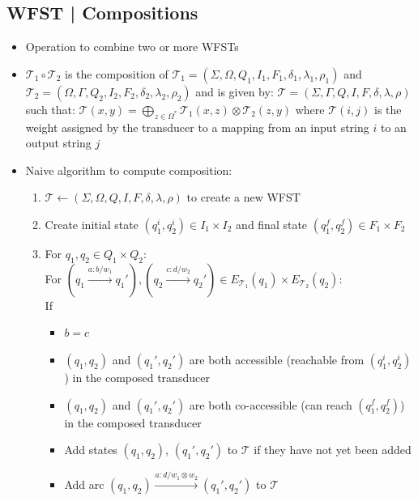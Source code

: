 \subsection*{WFST | Compositions}
\begin{itemize}
    \item Operation to combine two or more WFSTs
    \item $\mathcal{T}_1 \circ \mathcal{T}_2$ is the composition of $\mathcal{T}_1 = (\Sigma, \Omega, Q_1, I_1, F_1, \delta_1, \lambda_1, \rho_1)$ and $\mathcal{T}_2 = (\Omega, \Gamma, Q_2, I_2, F_2, \delta_2, \lambda_2, \rho_2)$ and is given by:
    $
    \mathcal{T} = (\Sigma, \Gamma, Q, I, F, \delta, \lambda, \rho)
    $
    such that:
    $
    \mathcal{T}(x, y) = \bigoplus_{z \in \Omega^*} \mathcal{T}_1(x, z) \otimes \mathcal{T}_2(z, y)
    $ where $\mathcal{T}(i,j)$ is the weight assigned by the transducer to a mapping from an input string $i$ to an output string $j$
    \item Naive algorithm to compute composition:
    \begin{enumerate}
        \item $\mathcal{T} \gets (\Sigma, \Omega, Q, I, F, \delta, \lambda, \rho)$ to create a new WFST
        \item Create initial state $(q_1^i, q_2^i) \in I_1 \times I_2$ and final state $(q_1^f, q_2^f) \in F_1 \times F_2$
        \item For $q_1, q_2 \in Q_1 \times Q_2$:\\
        For
        $
        (q_1 \xrightarrow{a:b/w_1} q_1'), (q_2 \xrightarrow{c:d/w_2} q_2') \in  E_{\mathcal{T}_1}(q_1) \times E_{\mathcal{T}_2}(q_2):
        $\\
        If 
        \begin{itemize}
            \item $b=c$
            \item $(q_1, q_2)$ and $(q_1', q_2')$ are both accessible (reachable from $(q_1^i, q_2^i)$) in the composed transducer
            \item $(q_1, q_2)$ and $(q_1', q_2')$ are both co-accessible (can reach $(q_1^f, q_2^f)$) in the composed transducer
        \end{itemize}
        \begin{itemize}
            \item Add states $(q_1, q_2)$, $(q_1', q_2')$ to $\mathcal{T}$ if they have not yet been added
            \item Add arc $(q_1, q_2) \xrightarrow{a:d/w_1 \otimes w_2} (q_1', q_2')$ to $\mathcal{T}$

\end{itemize}
\end{enumerate}
\end{itemize}
